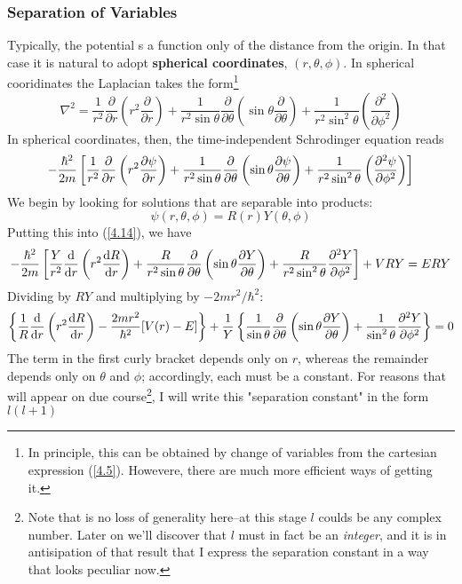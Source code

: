 \subsubsection{Separation of Variables}
Typically, the potential s a function only of the distance from the origin. In that case it is natural to adopt \textbf{spherical coordinates}, $(r,\theta,\phi)$. In spherical cooridinates the Laplacian takes the form\footnote{In principle, this can be obtained by change of variables from the cartesian expression (\ref{4.5}). Howevere, there are much more efficient ways of getting it.}
\begin{equation}\label{4.13}
	\nabla^2=\frac{1}{r^2}\frac{\partial}{\partial r}\left(r^2\frac{\partial}{\partial r}\right)+\frac{1}{r^2\sin\theta}\frac{\partial}{\partial \theta}\left(\sin\theta\frac{\partial}{\partial \theta}\right)+\frac{1}{r^2\sin^2\theta}\left(\frac{\partial^2}{\partial\phi^2}\right)
\end{equation}
In spherical coordinates, then, the time-independent Schrodinger equation reads
\begin{equation}\label{4.14}
	-\frac{\hbar^2}{2m}\left[\frac{1}{r^2}\frac{\partial}{\partial r}\left(r^2\pdv{\psi}{r}\right)+\frac{1}{r^2\sin\theta}\frac{\partial}{\partial\theta}\left(\sin\theta\pdv{\psi}{\theta}\right)+\frac{1}{r^2\sin^2\theta}\left(\pdv[2]{\psi}{\phi}\right)\right]
\end{equation}
We begin by looking for solutions that are separable into products:
\begin{equation}\label{4.15}
	\psi(r,\theta,\phi)=R(r)Y(\theta,\phi)
\end{equation}
Putting this into (\ref{4.14}), we have $$-\frac{\hbar^2}{2m}\left[\frac{Y}{r^2}\frac{\dd}{\dd r}\left(r^2\dv{R}{r}\right)+\frac{R}{r^2\sin\theta}\frac{\partial}{\partial\theta}\left(\sin\theta\pdv{Y}{\theta}\right)+\frac{R}{r^2\sin^2\theta}\pdv[2]{Y}{\phi}\right]+VRY=ERY$$ Dividing by $RY$ and multiplying by $-2mr^2/\hbar^2$:
\begin{equation*}
	\left\{\frac{1}{R}\frac{\dd}{\dd r}\left(r^2\dv{R}{r}\right)-\frac{2mr^2}{\hbar^2}[V(r)-E]\right\}+\frac{1}{Y}\left\{\frac{1}{\sin\theta}\frac{\partial}{\partial\theta}\left(\sin\theta\pdv{Y}{\theta}\right)+\frac{1}{\sin^2\theta}\pdv[2]{Y}{\phi}\right\}=0
\end{equation*}
The term in the first curly bracket depends only on $r$, whereas the remainder depends only on $\theta$ and $\phi$; accordingly, each must be a constant. For reasons that will appear on due course\footnote{Note that is no loss of generality here--at this stage $l$ coulds be any complex number. Later on we'll discover that $l$ must in fact be an \textit{integer}, and it is in antisipation of that result that I express the separation constant in a way that looks peculiar now.}, I will write this "separation constant" in the form $l(l+1)$

